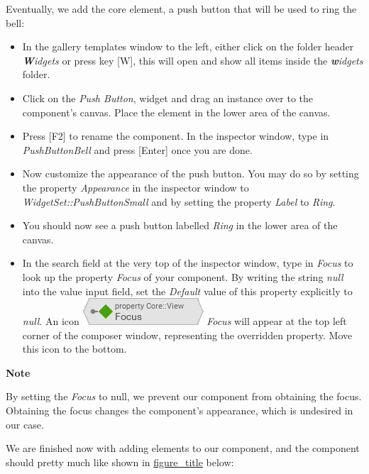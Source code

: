 \documentclass[
  a4paper,
,tablecaptionabove
]{scrbook}
\renewenvironment{quote}{\begin{customblockquote}\list{}{\rightmargin=0em\leftmargin=0em}%
\item\relax\color{blockquote-text}\ignorespaces}{\unskip\unskip\endlist\end{customblockquote}}
\begin{document}
Eventually, we add the core element, a push button that will be used to
ring the bell:

\begin{itemize}
\item
  In the gallery templates window to the left, either click on the
  folder header \emph{\textbf{W}idgets} or press key {[}W{]}, this
  will open and show all items inside the \emph{\textbf{w}idgets}
  folder.
\item
  Click on the \emph{Push Button}, widget and drag an instance over to
  the component's canvas. Place the element in the lower area of the
  canvas.
\item
  Press {[}F2{]} to rename the component. In the inspector window,
  type in \emph{PushButtonBell} and press {[}Enter{]} once you are
  done.
\item
  Now customize the appearance of the push button. You may do so by
  setting the property \emph{Appearance} in the inspector window to
  \emph{WidgetSet::PushButtonSmall} and by setting the property
  \emph{Label} to \emph{Ring}.
\item
  You should now see a push button labelled \emph{Ring} in the lower
  area of the canvas.
\item
  In the search field at the very top of the inspector window, type in
  \emph{Focus} to look up the property \emph{Focus} of your component.
  By writing the string \emph{null} into the value input field, set the
  \emph{Default} value of this property explicitly to \emph{null}. An
  icon
  \includegraphics{./../asciidoc/modules/ROOT/assets/images/icons/FocusPropertyIcon.png}
  \emph{Focus} will appear at the top left corner of the composer
  window, representing the overridden property. Move this icon to the
  bottom.
\end{itemize}

\begin{quote}
\textbf{Note}

By setting the \emph{Focus} to null, we prevent our component from
obtaining the focus. Obtaining the focus changes the component's
appearance, which is undesired in our case.
\end{quote}

We are finished now with adding elements to our component, and the
component should pretty much like shown in
\protect\hyperlink{fig:BellComponent}{figure\_title} below:
\end{document}
